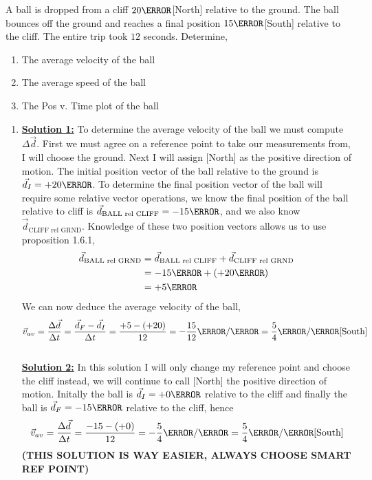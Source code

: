 \documentclass[12pt]{article} %
\newcommand{\tx}[1]{\text{#1}}
\begin{document}
\begin{qstn}[4]
\begin{soln}
    \end{soln}



\end{qstn}


\begin{qstn}[5]
A ball is dropped from a cliff $20\m$[North] relative to the ground. The ball bounces off the ground and reaches a final position $15\m$[South] relative to the cliff. The entire trip took $12$ seconds. Determine,
\begin{enumerate}[label = (\alph*)]
    \item The average velocity of the ball
    \item The average speed of the ball
    \item The Pos v. Time plot of the ball
\end{enumerate}

\begin{soln}
    \begin{enumerate}[label = (\alph*)]
        \item \textbf{\underline{Solution 1:}} To determine the average velocity of the ball we must compute $\Delta \vec d$. First we must agree on a reference point to take our measurements from, I will choose the ground. Next I will assign [North] as the positive direction of motion. The initial position vector of the ball relative to the ground is $\vec d_I = +20\m$. To determine the final position vector of the ball will require some relative vector operations, we know the final position of the ball relative to cliff is $\vec d_{\tx{BALL rel CLIFF}} = -15\m$, and we also know $\vec d_{\tx{CLIFF rel GRND}}$. Knowledge of these two position vectors allows us to use proposition 1.6.1, 
        \begin{align*}
            \vec d_{\tx{BALL rel GRND}} &= \vec d_{\tx{BALL rel CLIFF}} + \vec d_{\tx{CLIFF rel GRND}}\\
            &= -15\m + (+20\m)\\
            &= +5\m\\
        \end{align*}
        We can now deduce the average velocity of the ball,
            $$\vec v_{av} = \frac{\Delta \vec d}{\Delta t} = \frac{\vec d_F - \vec d_I}{\Delta t} = \frac{+5 - (+20)}{12} = -\frac{15}{12} \m / \s = \frac{5}{4} \m / \s \tx{[South]}$$\\


        \textbf{\underline{Solution 2:}} In this solution I will only change my reference point and choose the cliff instead, we will continue to call [North] the positive direction of motion. Initally the ball is $\vec d_I = +0 \m$ relative to the cliff and finally the ball is $\vec d_F = -15\m$ relative to the cliff, hence
        $$\vec v_{av} = \frac{\Delta \vec d}{\Delta t} = \frac{-15 - (+0)}{12} = -\frac{5}{4} \m / \s = \frac{5}{4} \m / \s \tx{[South]}$$
        \textbf{(THIS SOLUTION IS WAY EASIER, ALWAYS CHOOSE SMART REF POINT)}
            

\end{enumerate}
\end{soln}
\end{qstn}
\end{document}
